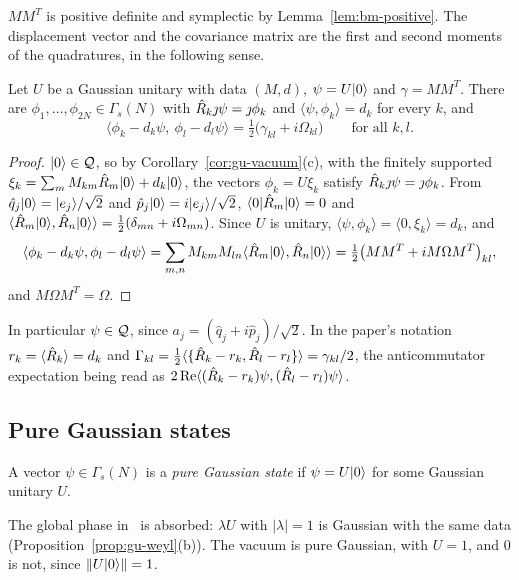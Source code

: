 \begin{veteenv}
$MM^T$ is positive definite and symplectic by Lemma~\ref{lem:bm-positive}. The displacement vector and the covariance matrix are the
first and second moments of the quadratures, in the following sense.

\begin{proposition}\label{prop:pg-moments}
Let $U$ be a Gaussian unitary with data $(M,d)$, $\psi=U\lvert 0\rangle$ and $\gamma=MM^T$. There are $\phi_1,\ldots,\phi_{2N}\in\Gamma_s(N)$ with
$\hat R_k\jmath\psi=\jmath\phi_k$ and $\langle\psi,\phi_k\rangle=d_k$ for every $k$, and
\[
 \langle\phi_k-d_k\psi,\ \phi_l-d_l\psi\rangle=\tfrac12\bigl(\gamma_{kl}+i\Omega_{kl}\bigr)\qquad\text{for all }k,l.
\]
\end{proposition}

\begin{proof}
$\lvert 0\rangle\in\mathcal Q$, so by Corollary~\ref{cor:gu-vacuum}(c), with the finitely supported $\xi_k=\sum_mM_{km}\hat R_m\lvert 0\rangle+d_k\lvert 0\rangle$, the vectors
$\phi_k=U\xi_k$ satisfy $\hat R_k\jmath\psi=\jmath\phi_k$. From $\hat q_j\lvert 0\rangle=\lvert e_j\rangle/\sqrt2$ and $\hat p_j\lvert 0\rangle=i\lvert e_j\rangle/\sqrt2$,
$\langle0\rvert\hat R_m\lvert 0\rangle=0$ and $\langle\hat R_m\lvert 0\rangle,\hat R_n\lvert 0\rangle\rangle=\frac12(\delta_{mn}+i\Omega_{mn})$. Since $U$ is unitary,
$\langle\psi,\phi_k\rangle=\langle0,\xi_k\rangle=d_k$, and
\[
 \langle\phi_k-d_k\psi,\phi_l-d_l\psi\rangle=\sum_{m,n}M_{km}M_{ln}\langle\hat R_m\lvert 0\rangle,\hat R_n\lvert 0\rangle\rangle=\tfrac12\bigl(MM^T+iM\Omega M^T\bigr)_{kl},
\]
and $M\Omega M^T=\Omega$.
\end{proof}

In particular $\psi\in\mathcal Q$, since $a_j=(\hat q_j+i\hat p_j)/\sqrt2$. In the paper's notation $r_k=\langle\hat R_k\rangle=d_k$ and
$\Gamma_{kl}=\frac12\langle\{\hat R_k-r_k,\hat R_l-r_l\}\rangle=\gamma_{kl}/2$, the anticommutator expectation being read as
$2\operatorname{Re}\langle(\hat R_k-r_k)\psi,(\hat R_l-r_l)\psi\rangle$.

\subsection{Pure Gaussian states}\label{sec:pg-pure}

\begin{definition}\label{def:pg-pure}
A vector $\psi\in\Gamma_s(N)$ is a \emph{pure Gaussian state} if $\psi=U\lvert 0\rangle$ for some Gaussian unitary $U$.
\end{definition}

The global phase in~\cite[(4)]{tjoacirac} is absorbed: $\lambda U$ with $\lvert\lambda\rvert=1$ is Gaussian with the same data
(Proposition~\ref{prop:gu-weyl}(b)). The vacuum is pure Gaussian, with $U=1$, and $0$ is not, since $\lVert U\lvert 0\rangle\rVert=1$.


\end{veteenv}
